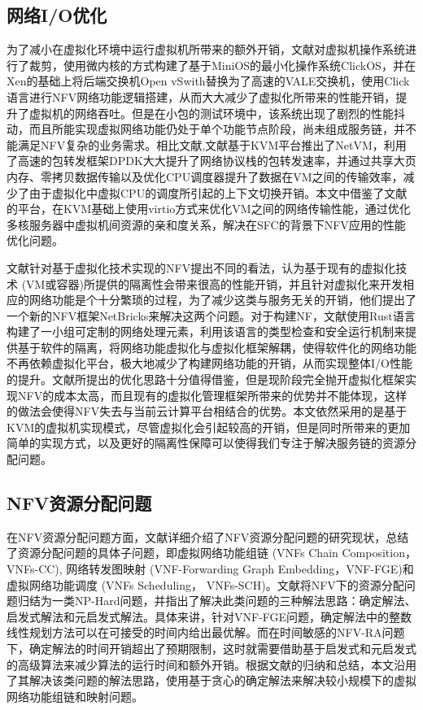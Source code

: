 \subsection{网络I/O优化}
为了减小在虚拟化环境中运行虚拟机所带来的额外开销，文献对虚拟机操作系统进行了裁剪，使用微内核的方式构建了基于MiniOS\cite{popuri2014tour}的最小化操作系统ClickOS，并在Xen\cite{barham2003xen}的基础上将后端交换机Open vSwith\cite{pfaff2015design}替换为了高速的VALE交换机\cite{rizzo2012netmap}，使用Click语言\cite{kohler2000click}进行NFV网络功能逻辑搭建，从而大大减少了虚拟化所带来的性能开销，提升了虚拟机的网络吞吐。但是在小包的测试环境中，该系统出现了剧烈的性能抖动，而且所能实现虚拟网络功能仍处于单个功能节点阶段，尚未组成服务链，并不能满足NFV复杂的业务需求。相比文献,文献基于KVM平台\cite{kivity2007kvm}推出了NetVM，利用了高速的包转发框架DPDK\cite{intel2015data}大大提升了网络协议栈的包转发速率，并通过共享大页内存、零拷贝数据传输以及优化CPU调度器提升了数据在VM之间的传输效率，减少了由于虚拟化中虚拟CPU的调度所引起的上下文切换开销。本文中借鉴了文献的平台，在KVM基础上使用virtio\cite{russell2008virtio}方式来优化VM之间的网络传输性能，通过优化多核服务器中虚拟机间资源的亲和度关系，解决在SFC的背景下NFV应用的性能优化问题。

文献针对基于虚拟化技术实现的NFV提出不同的看法，认为基于现有的虚拟化技术 (VM或容器)所提供的隔离性会带来很高的性能开销，并且针对虚拟化来开发相应的网络功能是个十分繁琐的过程，为了减少这类与服务无关的开销，他们提出了一个新的NFV框架NetBricks来解决这两个问题。对于构建NF，文献使用Rust语言构建了一小组可定制的网络处理元素，利用该语言的类型检查和安全运行机制来提供基于软件的隔离，将网络功能虚拟化与虚拟化框架解耦，使得软件化的网络功能不再依赖虚拟化平台，极大地减少了构建网络功能的开销，从而实现整体I/O性能的提升。文献所提出的优化思路十分值得借鉴，但是现阶段完全抛开虚拟化框架实现NFV的成本太高，而且现有的虚拟化管理框架所带来的优势并不能体现，这样的做法会使得NFV失去与当前云计算平台相结合的优势。本文依然采用的是基于KVM的虚拟机实现模式，尽管虚拟化会引起较高的开销，但是同时所带来的更加简单的实现方式，以及更好的隔离性保障可以使得我们专注于解决服务链的资源分配问题。


\subsection{NFV资源分配问题}
在NFV资源分配问题方面，文献详细介绍了NFV资源分配问题的研究现状，总结了资源分配问题的具体子问题，即虚拟网络功能组链 (VNFs Chain Composition，VNFs-CC), 网络转发图映射 (VNF-Forwarding Graph Embedding，VNF-FGE)和虚拟网络功能调度 (VNFs Scheduling， VNFs-SCH)。文献将NFV下的资源分配问题归结为一类NP-Hard问题，并指出了解决此类问题的三种解法思路：确定解法、启发式解法和元启发式解法。具体来讲，针对VNF-FGE问题，确定解法中的整数线性规划方法可以在可接受的时间内给出最优解。而在时间敏感的NFV-RA问题下，确定解法的时间开销超出了预期限制，这时就需要借助基于启发式和元启发式的高级算法来减少算法的运行时间和额外开销。根据文献的归纳和总结，本文沿用了其解决该类问题的解法思路，使用基于贪心的确定解法来解决较小规模下的虚拟网络功能组链和映射问题。

